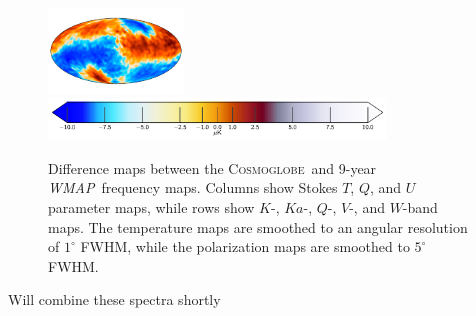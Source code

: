 \documentclass[twocolumn]{../../common/aa}
\def\WMAP{\emph{WMAP}}
\newcommand{\cosmoglobe}{\textsc{Cosmoglobe}}
\begin{document}
\begin{figure}
        \includegraphics[width=0.32\textwidth]{figures/megadiff_W_U.pdf}\\\vspace*{-4mm}
	\includegraphics[width=0.8\textwidth]{figures/cbar_10uK_symlog2.pdf}
	\caption{Difference maps between the \cosmoglobe\ and 9-year \WMAP\ frequency maps. Columns show Stokes $T$, $Q$, and $U$ parameter maps, while rows show $K$-, $Ka$-, $Q$-, $V$-, and $W$-band maps. The temperature maps are smoothed to an angular resolution of $1^{\circ}$ FWHM, while the polarization maps are smoothed to $5^{\circ}$ FWHM.}
        \label{fig:megadiff_wmap}
\end{figure}



Will combine these spectra shortly
\end{document}
